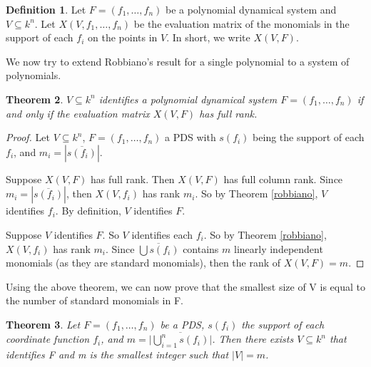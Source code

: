 \documentclass{amsart}
\newtheorem{thm}{Theorem}[section]
\theoremstyle{definition}
\newtheorem{defn}[thm]{Definition}
\theoremstyle{remark}
\theoremstyle{example}
\theoremstyle{conjecture}
\numberwithin{equation}{section}
\begin{document}
\begin{defn}
Let $F=(f_1, \ldots ,f_n)$ be a  polynomial dynamical system and
$V\subseteq k^n$. Let $X(V,f_1,\ldots,f_n)$ be the evaluation matrix
of the monomials in the support of each $f_i$ on the points in $V$.
In short, we write $X(V,F)$.
\end{defn}

We now try to extend Robbiano's result for a single polynomial to a system of polynomials.
\begin{thm}
\label{1}
$V\subseteq k^n$ identifies a polynomial dynamical system $F=(f_1,
\ldots ,f_n)$ if and only if the evaluation matrix $X(V,F)$ has full
rank.
\end{thm}

\begin{proof}
Let $V\subseteq k^n$, $F=(f_1, \ldots ,f_n)$ a PDS with $s(f_i)$
being the support of each $f_i$, and $m_i=|\overline{s(f_i)}|$.

Suppose $X(V,F)$ has full rank. Then $X(V,F)$ has full column rank. Since $m_i=|\overline{s(f_i)}|$,
then $X(V,f_i)$ has rank $m_i$.
So by Theorem \ref{robbiano}, $V$ identifies $f_i$. By definition,
$V$ identifies $F$.

Suppose $V$ identifies $F$.  So $V$ identifies each $f_i$.  So by
Theorem \ref{robbiano}, $X(V,f_i)$ has rank $m_i$.  Since
$\overline{\bigcup s(f_i)}$ contains $m$ linearly independent
monomials (as they are standard monomials), then the rank of
$X(V,F)= m$.
\end{proof}

Using the above theorem, we can now prove that the smallest size of V is equal to the number of standard monomials in F.

\begin{thm}
\label{thm2}
Let $F=(f_1,\ldots,f_n)$ be a PDS, $s(f_i)$ the support
of each coordinate function $f_i$, and $m=\lvert
\overline{\bigcup_{i=1}^n s(f_i)}\rvert$. Then there exists $V\subseteq k^n$ that identifies F and m is the smallest integer such that $|V|=m$.
\end{thm}
\end{document}

